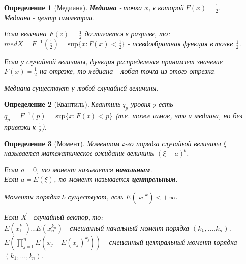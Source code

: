 \documentclass[14pt]{extarticle}
\theoremstyle{breakstyle}
\newtheorem{definition}{Определение}[subsection]
\begin{document}
\begin{definition}[Медиана]

\textbf{Медиана} - точка $x$, в которой $F(x) = \frac{1}{2}$.\\
Медиана - центр симметрии.

\vspace{\baselineskip}

Если величина $F(x) = \frac{1}{2}$ достигается в разрыве, то:\\
$medX = F^{-1}(\frac{1}{2}) = \text{sup}\{x: F(x) < \frac{1}{2}\}$ - псевдообратная функция в точке $\frac{1}{2}$.

\vspace{\baselineskip}

Если у случайной величины, функция распределения принимает значение $F(x) = \frac{1}{2}$ на отрезке, то медиана - любая точка из этого отрезка.

\vspace{\baselineskip}

Медиана существует у любой случайной величины.

\end{definition}

\begin{definition}[Квантиль]

Квантиль $q_{p}$ уровня $p$ есть $q_{p} = F^{-1}(p) = \text{sup}\{x: F(x) < p\}$ (т.е. тоже самое, что и медиана, но без привязки к $\frac{1}{2}$).

\end{definition}

\begin{definition}[Момент]

Моментом $k$-го порядка случайной величины $\xi$ называется математическое ожидание величины $(\xi - a)^{k}$.

\vspace{\baselineskip}

Если $a = 0$, то момент называется \textbf{начальным}.\\
Если $a = E(\xi)$, то момент называется \textbf{центральным}.

\vspace{\baselineskip}

Моменты порядка $k$ существуют, если $E(|x|^{k}) < +\infty$.

\vspace{\baselineskip}

Если $\vec{X}$ - случайный вектор, то:\\
$E(x_{1}^{k_{1}})...E(x_{n}^{k_{n}})$ - смешанный начальный момент порядка $(k_{1}, ..., k_{n})$.\\
$E(\prod_{j=1}^{n}E(x_{j} - E(x_{j})^{k_{j}}))$ - смешанный центральный момент порядка $(k_{1}, ..., k_{n})$.

\end{definition}
\end{document}
